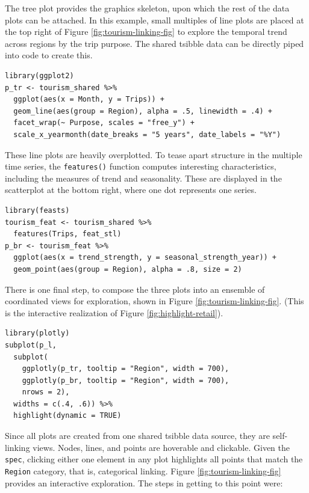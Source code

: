 The tree plot provides the graphics skeleton, upon which the rest of the data plots can be attached. In this example, small multiples of line plots are placed at the top right of Figure \ref{fig:tourism-linking-fig} to explore the temporal trend across regions by the trip purpose. The shared tsibble data can be directly piped into  code to create this.

\begin{verbatim}
library(ggplot2)
p_tr <- tourism_shared %>%
  ggplot(aes(x = Month, y = Trips)) +
  geom_line(aes(group = Region), alpha = .5, linewidth = .4) +
  facet_wrap(~ Purpose, scales = "free_y") +
  scale_x_yearmonth(date_breaks = "5 years", date_labels = "%Y")
\end{verbatim}

These line plots are heavily overplotted. To tease apart structure in the multiple time series, the \texttt{features()} function computes interesting characteristics, including the measures of trend and seasonality. These are displayed in the scatterplot at the bottom right, where one dot represents one series.

\begin{verbatim}
library(feasts)
tourism_feat <- tourism_shared %>%
  features(Trips, feat_stl)
p_br <- tourism_feat %>%
  ggplot(aes(x = trend_strength, y = seasonal_strength_year)) +
  geom_point(aes(group = Region), alpha = .8, size = 2)
\end{verbatim}

There is one final step, to compose the three plots into an ensemble of coordinated views for exploration, shown in Figure \ref{fig:tourism-linking-fig}. (This is the interactive realization of Figure \ref{fig:highlight-retail}).

\begin{verbatim}
library(plotly)
subplot(p_l,
  subplot(
    ggplotly(p_tr, tooltip = "Region", width = 700),
    ggplotly(p_br, tooltip = "Region", width = 700),
    nrows = 2),
  widths = c(.4, .6)) %>%
  highlight(dynamic = TRUE)
\end{verbatim}

Since all plots are created from one shared tsibble data source, they are self-linking views. Nodes, lines, and points are hoverable and clickable. Given the \texttt{spec}, clicking either one element in any plot highlights all points that match the \texttt{Region} category, that is, categorical linking. Figure \ref{fig:tourism-linking-fig} provides an interactive exploration. The steps in getting to this point were:

